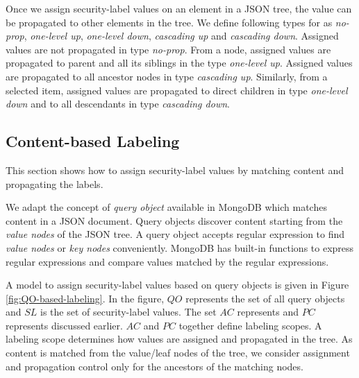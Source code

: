   


 Once we assign security-label values on an element in a JSON tree, the value can be propagated to other elements in the tree. We define following  types for \propagationControl{} as \textit{no-prop},  \textit{one-level up}, \textit{one-level down},  \textit{cascading up} and \textit{cascading down}. Assigned values are not propagated in type \textit{no-prop}. From a node, assigned values are propagated to parent and all its siblings in the type \textit{one-level up}. Assigned values are propagated to all ancestor nodes in type \textit{cascading up}. Similarly, from a selected item, assigned values are propagated to direct children in type \textit{one-level down} and to all descendants in type \textit{cascading down}. %
 
% 
 

\subsection{Content-based Labeling}

  


This section shows how to assign security-label values by matching content and propagating the labels.

We adapt the concept of \textit{query object} available in MongoDB \cite{mongodb} which matches content in a JSON document. Query objects discover content starting from the \textit{value nodes} of the JSON tree. A query object accepts regular expression to find \textit{value nodes}  or \textit{key nodes} conveniently. MongoDB has built-in functions to express regular expressions and compare values matched by the regular expressions. 

A model to assign {security-label} values based on query objects is given in Figure \ref{fig:QO-based-labeling}. In the figure, $QO$ represents the set of all query objects and $SL$ is the set of {security-label} values. The set $AC$ represents \assignmentControl{} and $PC$ represents \propagationControl{} discussed earlier.  $AC$ and $PC$ together define labeling scopes. A labeling scope determines how values are assigned and propagated in the tree. As content is matched from the value/leaf nodes of the tree, we consider assignment and propagation control only for the ancestors of the matching nodes.

